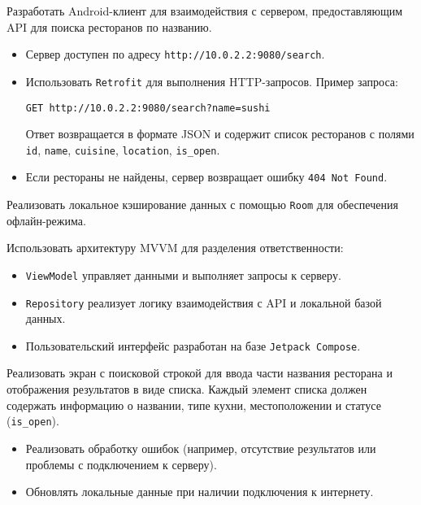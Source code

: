 
Разработать Android-клиент для взаимодействия с сервером, предоставляющим API для поиска ресторанов по названию.

\begin{itemize}
    \item Сервер доступен по адресу \texttt{http://10.0.2.2:9080/search}.
    \item Использовать \texttt{Retrofit} для выполнения HTTP-запросов. Пример запроса:
\begin{verbatim}
GET http://10.0.2.2:9080/search?name=sushi
\end{verbatim}
Ответ возвращается в формате JSON и содержит список ресторанов с полями \texttt{id}, 
\texttt{name}, \texttt{cuisine}, \texttt{location}, \texttt{is_open}.
    \item Если рестораны не найдены, сервер возвращает ошибку \texttt{404 Not Found}.
\end{itemize}

Реализовать локальное кэширование данных с помощью \texttt{Room} для обеспечения офлайн-режима.

Использовать архитектуру MVVM для разделения ответственности:
\begin{itemize}
    \item \texttt{ViewModel} управляет данными и выполняет запросы к серверу.
    \item \texttt{Repository} реализует логику взаимодействия с API и локальной базой данных.
    \item Пользовательский интерфейс разработан на базе \texttt{Jetpack Compose}.
\end{itemize}

Реализовать экран с поисковой строкой для ввода части названия ресторана и отображения результатов в виде списка. Каждый элемент списка должен содержать информацию о названии, типе кухни, местоположении и статусе (\texttt{is_open}).

\begin{itemize}
    \item Реализовать обработку ошибок (например, отсутствие результатов или проблемы с подключением к серверу).
    \item Обновлять локальные данные при наличии подключения к интернету.
\end{itemize}
